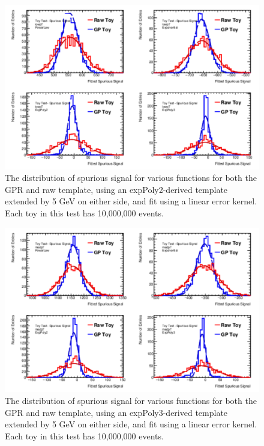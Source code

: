 \begin{figure} 
\begin{center}
  \includegraphics[width=\textwidth]{figures/background/gpr/validation/linear/ToyTest_FitSigVals_lowpT_10M_noSig}   
\caption{The distribution of spurious signal for various functions for both the GPR and raw template, using an expPoly2-derived template extended by 5 GeV on either side, and fit using a linear error kernel. Each toy in this test has 10,000,000 events.}
\label{fig:linearkernel_lowpt_10M_noSig}
\end{center}
\end{figure}

\begin{figure} 
\begin{center}
  \includegraphics[width=\textwidth]{figures/background/gpr/validation/linear/ToyTest_FitSigVals_medpT_10M_noSig}   
\caption{The distribution of spurious signal for various functions for both the GPR and raw template, using an expPoly3-derived template extended by 5 GeV on either side, and fit using a linear error kernel. Each toy in this test has 10,000,000 events.}
\label{fig:linearkernel_medpt_10M_noSig}
\end{center}
\end{figure}

